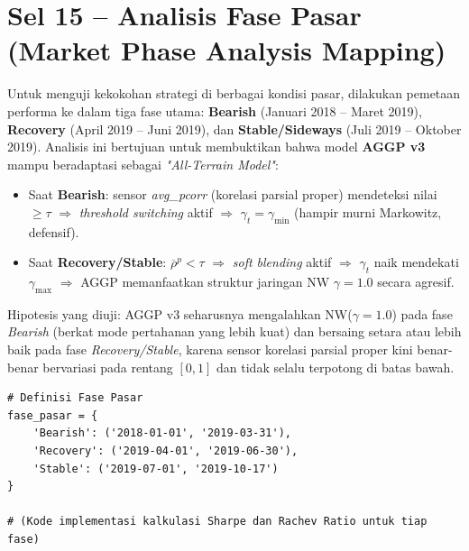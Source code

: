 \documentclass[12pt,a4paper]{article}
\begin{document}
\section{Sel 15 -- Analisis Fase Pasar (Market Phase Analysis Mapping)}
Untuk menguji kekokohan strategi di berbagai kondisi pasar, dilakukan pemetaan performa ke dalam tiga fase utama: \textbf{Bearish} (Januari 2018 -- Maret 2019), \textbf{Recovery} (April 2019 -- Juni 2019), dan \textbf{Stable/Sideways} (Juli 2019 -- Oktober 2019). Analisis ini bertujuan untuk membuktikan bahwa model \textbf{AGGP v3} mampu beradaptasi sebagai \textit{"All-Terrain Model"}:
\begin{itemize}
    \item Saat \textbf{Bearish}: sensor \textit{avg\_pcorr} (korelasi parsial proper) mendeteksi nilai $\geq \tau$ $\Rightarrow$ \textit{threshold switching} aktif $\Rightarrow$ $\gamma_t = \gamma_{\min}$ (hampir murni Markowitz, defensif).
    \item Saat \textbf{Recovery/Stable}: $\overline{\rho}^p < \tau$ $\Rightarrow$ \textit{soft blending} aktif $\Rightarrow$ $\gamma_t$ naik mendekati $\gamma_{\max}$ $\Rightarrow$ AGGP memanfaatkan struktur jaringan NW $\gamma=1.0$ secara agresif.
\end{itemize}
Hipotesis yang diuji: AGGP v3 seharusnya mengalahkan NW($\gamma=1.0$) pada fase \textit{Bearish} (berkat mode pertahanan yang lebih kuat) dan bersaing setara atau lebih baik pada fase \textit{Recovery/Stable}, karena sensor korelasi parsial proper kini benar-benar bervariasi pada rentang $[0,1]$ dan tidak selalu terpotong di batas bawah.

\begin{lstlisting}[caption={Kalkulasi Metrik Berdasarkan Fase Pasar}]
# Definisi Fase Pasar
fase_pasar = {
    'Bearish': ('2018-01-01', '2019-03-31'),
    'Recovery': ('2019-04-01', '2019-06-30'),
    'Stable': ('2019-07-01', '2019-10-17')
}

# (Kode implementasi kalkulasi Sharpe dan Rachev Ratio untuk tiap fase)
\end{lstlisting}
\end{document}
